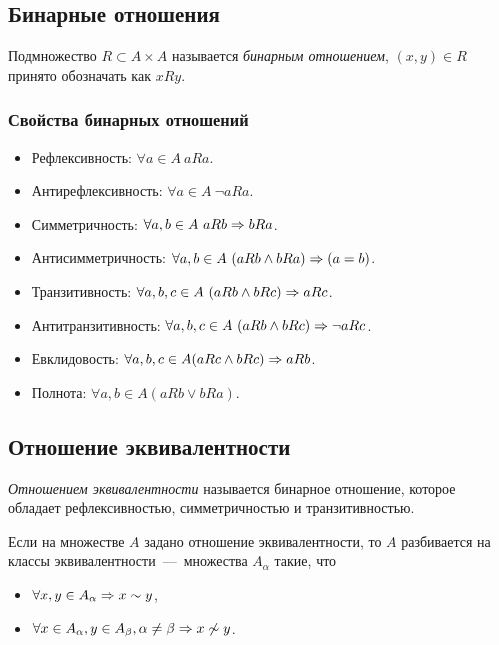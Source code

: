 \subsection{Бинарные отношения}

\begin{definition}
	Подмножество $R \subset A \times A$ называется \textit{бинарным отношением},
	$(x, y) \in R$ принято обозначать как $xRy$.
\end{definition}

\subsubsection*{Свойства бинарных отношений}

\begin{itemize}
	\item Рефлексивность: $\forall a \in A\ aRa$.
	\item Антирефлексивность: $\forall a \in A\ \neg aRa$.
	\item Симметричность: $\forall a, b \in A\ aRb \Ra bRa$.
	\item Антисимметричность: $\forall a, b \in A\ (aRb \wedge bRa) \Rightarrow (a = b)$.
	\item Транзитивность: $\forall a, b, c \in A\ (aRb \wedge bRc) \Ra aRc$.
	\item Антитранзитивность: $\forall a, b, c \in A\ (aRb \wedge bRc) \Rightarrow \neg aRc$.
	\item Евклидовость: $\forall a, b, c \in A (aRc \wedge bRc) \Rightarrow aRb$.
	\item Полнота: $\forall a, b \in A (aRb \vee bRa)$.
\end{itemize}

\subsection{Отношение эквивалентности}

\begin{definition}
	\textit{Отношением эквивалентности} называется бинарное отношение, которое обладает рефлексивностью, симметричностью и транзитивностью.
\end{definition}

\begin{theorem}
	Если на множестве $A$ задано отношение эквивалентности, то $A$ разбивается на классы эквивалентности~---~множества $A_{\alpha}$ такие, что
	\begin{itemize}
		\item $\forall x, y \in A_{\alpha} \Rightarrow x \sim y$,
		\item $\forall x \in A_{\alpha}, y \in A_{\beta}, \alpha \neq \beta \Rightarrow x \not\sim y$.
	\end{itemize}
\end{theorem}

